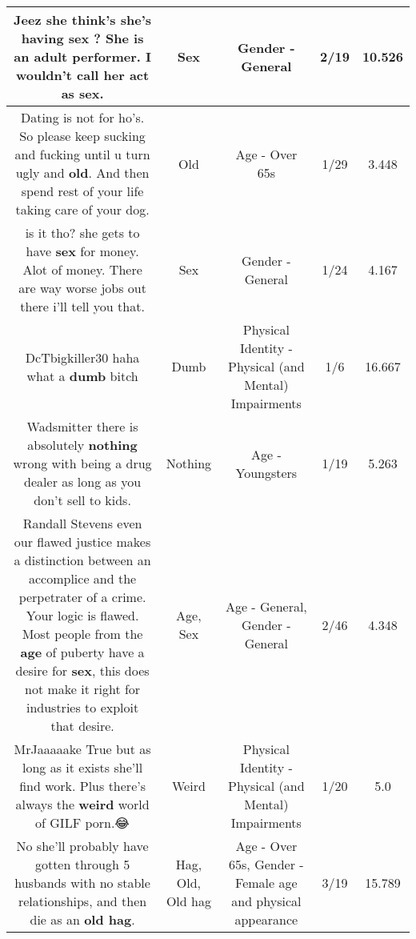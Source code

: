 \documentclass[11pt]{article}
\newlength\mylength
\begin{document}
\begin{center}
\begin{longtable}{|C{.65\mylength}|C{.30\mylength}|C{.12\mylength}|C{.12\mylength}|C{.12\mylength}|}
  \small Jeez she think's she's having \textbf{sex} ? She is an adult performer. I wouldn't call her act as \textbf{sex}.\normalsize   & Sex & Gender - General & 2/19 & 10.526 \\  \hline
  \small Dating is not for ho's. So please keep sucking and fucking until u turn ugly and \textbf{old}. And then spend rest of your life taking care of your dog.\normalsize   & Old & Age - Over 65s & 1/29 & 3.448 \\  \hline
  \small is it tho? she gets to have \textbf{sex} for money. Alot of money. There are way worse jobs out there i'll tell you that.\normalsize   & Sex & Gender - General & 1/24 & 4.167 \\  \hline
  \small DcTbigkiller30 haha what a \textbf{dumb} bitch\normalsize   & Dumb & Physical Identity - Physical (and Mental) Impairments & 1/6 & 16.667 \\  \hline
  \small Wadsmitter there is absolutely \textbf{nothing} wrong with being a drug dealer as long as you don't sell to kids.\normalsize   & Nothing & Age - Youngsters & 1/19 & 5.263 \\  \hline
  \small Randall Stevens even our flawed justice makes a distinction between an accomplice and the perpetrater of a crime.  Your logic is flawed. Most people from the \textbf{age} of puberty have a desire for \textbf{sex}, this does not make it right for industries to exploit that desire.\normalsize   & Age, Sex & Age - General, Gender - General & 2/46 & 4.348 \\  \hline
  \small MrJaaaaake True but as long as it exists she'll find work. Plus there's always the \textbf{weird} world of GILF porn.😂\normalsize   & Weird & Physical Identity - Physical (and Mental) Impairments & 1/20 & 5.0 \\  \hline
  \small No she'll probably have gotten through 5 husbands with no stable relationships, and then die as an \textbf{o\textbf{ld} h\textbf{ag}}.\normalsize   & Hag, Old, Old hag & Age - Over 65s, Gender - Female age and physical appearance & 3/19 & 15.789 \\  \hline

\end{longtable}
\end{center}
\end{document}
